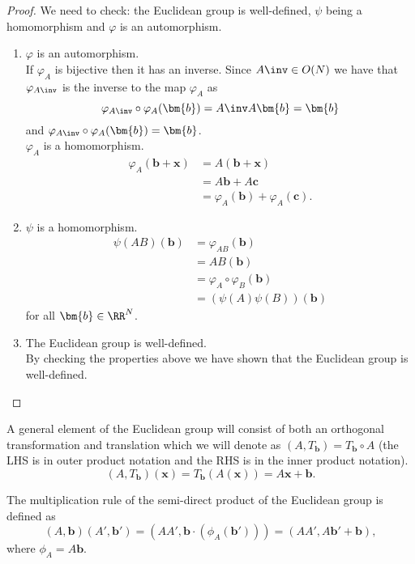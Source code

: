\documentclass[12pt, a4paper]{article}
\begin{document}
\begin{proof}
    We need to check: the Euclidean group is well-defined, \(\psi\) being a homomorphism and \(\varphi\) is an automorphism.
    \begin{enumerate}
        \item \(\varphi\) is an automorphism. \\
        If \(\varphi_A\) is bijective then it has an inverse. Since \(A\inv \in O(N)\) we have that \(\varphi_{A\inv}\) is the inverse to the map \(\varphi_A\) as 
        \[\varphi_{A\inv} \circ \varphi_A(\bm{b}) = A\inv A \bm{b} =\bm{b}\]
        and \(\varphi_{A\inv} \circ \varphi_A(\bm{b})=\bm{b}\). \\
        \(\varphi_A\) is a homomorphism.
        \[\begin{aligned}
            \varphi_A(\bm{b}+\bm{x})&=A(\bm{b}+\bm{x}) \\
            &= A\bm{b}+A\bm{c} \\
            &= \varphi_A(\bm{b})+\varphi_A(\bm{c}).
        \end{aligned}\]
        \item \(\psi\) is a homomorphism.
        \[\begin{aligned}
            \psi(AB)(\bm{b}) &= \varphi_{AB}(\bm{b}) \\
            &= AB(\bm{b}) \\
            &= \varphi_A \circ \varphi_B (\bm{b}) \\
            &= (\psi(A)\psi(B))(\bm{b})
        \end{aligned}\]
        for all \(\bm{b} \in \RR^N\).
        \item The Euclidean group is well-defined. \\
        By checking the properties above we have shown that the Euclidean group is well-defined.
    \end{enumerate}
\end{proof}

\noindent A general element of the Euclidean group will consist of both an orthogonal \\ transformation and translation which we will denote as \((A,T_{\bm{b}})=T_{\bm{b}} \circ A\) (the LHS is in outer product notation and the RHS is in the inner product notation). 
\[(A,T_{\bm{b}})(\bm{x}) =T_{\bm{b}}(A(\bm{x})) = A\bm{x}+\bm{b}.\]

\begin{theorem}
    The multiplication rule of the semi-direct product of the Euclidean group is defined as
    \[(A,\bm{b})(A',\bm{b}')=(AA',\bm{b} \cdot (\phi_A(\bm{b}')))=(AA',A\bm{b}'+\bm{b}),\]
    where \(\phi_A = A\bm{b}\).
\end{theorem}
\end{document}
